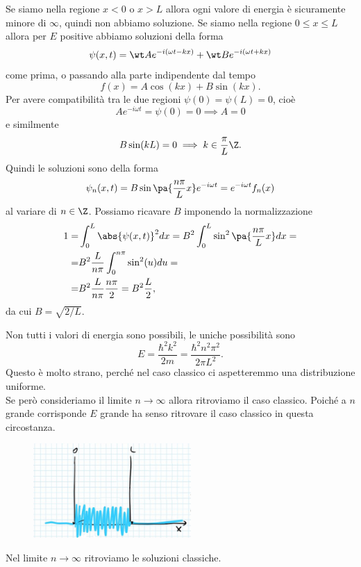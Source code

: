 \noindent
Se siamo nella regione $x<0$ o $x>L$ allora ogni valore di energia \`e sicuramente minore di $\infty$, quindi non abbiamo soluzione. Se siamo nella regione $0\leq x\leq L$ allora per $E$ positive abbiamo soluzioni della forma
\[\psi(x,t)=\wt Ae^{-i(\omega t-kx)}+\wt Be^{-i(\omega t+kx)}\]
come prima, o passando alla parte indipendente dal tempo
\[f(x)=A\cos(kx)+B\sin(kx).\]
Per avere compatibilit\`a tra le due regioni $\psi(0)=\psi(L)=0$, cio\`e
\[Ae^{-i\omega t}=\psi(0)=0\implies A=0\]
e similmente
\[B\sin(kL)=0\implies k\in \frac \pi L\Z.\]
Quindi le soluzioni sono della forma
\[\psi_n(x,t)=B\sin\pa{\frac{n\pi}L x} e^{-i\omega t}=e^{-i\omega t}f_n(x)\]
al variare di $n\in\Z$. Possiamo ricavare $B$ imponendo la normalizzazione
\begin{align*}
1=&\int_0^L\abs{\psi(x,t)}^2dx=B^2\int_0^L\sin^2\pa{\frac{n\pi}L x}dx=\\
=&B^2\frac{L}{n\pi}\int_0^{n\pi} \sin^2(u)du=\\
=&B^2\frac{L}{n\pi}\frac{n\pi}2=B^2\frac L2,
\end{align*}
da cui $B=\sqrt{2/L}$.

\begin{remark}
Non tutti i valori di energia sono possibili, le uniche possibilit\`a sono
\[E=\frac{\hbar^2k^2}{2m}=\frac{\hbar^2n^2\pi^2}{2\pi L^2}.\]
Questo \`e molto strano, perch\'e nel caso classico ci aspetteremmo una distribuzione uniforme.\\
Se per\`o consideriamo il limite $n\to\infty$ allora ritroviamo il caso classico. Poich\'e a $n$ grande corrisponde $E$ grande ha senso ritrovare il caso classico in questa circostanza.

\begin{figure}[!htb]
    \centering
    \includegraphics[width=6cm]{images/principio_di_corrispondenza.png}
\end{figure}
\end{remark}

\begin{fact}
Nel limite $n\to\infty$ ritroviamo le soluzioni classiche.
\end{fact}

